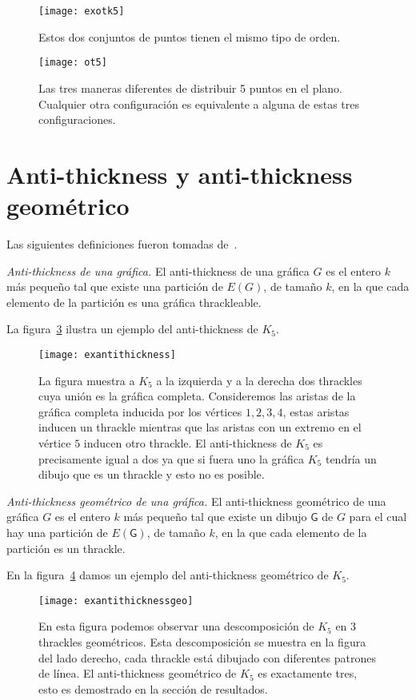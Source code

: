 \begin{figure}[htpb]
  \centering
  \texttt{[image: exotk5]}
  \caption{Estos dos conjuntos de puntos tienen el mismo tipo de orden.}
  \label{fig:exotk5}
\end{figure}
\begin{figure}[htpb]
  \centering
  \texttt{[image: ot5]}
  \caption{Las tres maneras diferentes de distribuir 5 puntos en el plano. Cualquier
  otra configuración es equivalente a alguna de estas tres configuraciones.}
  \label{fig:ot5}
\end{figure}

\section{Anti-thickness y anti-thickness geométrico}
Las siguientes definiciones fueron tomadas de~\cite{Dujmovic2017}.
\begin{definition}{\emph{Anti-thickness de una gráfica.}}
  El anti-thickness de una gráfica $G$ es el entero $k$ más pequeño tal que existe una
  partición de $E(G)$, de tamaño $k$, en la que cada elemento de la partición
  es una gráfica thrackleable.
\end{definition}
La figura~\ref{fig:exantithickness} ilustra un ejemplo del anti-thickness de $K_5$.
\begin{figure}[htpb]
  \centering
  \texttt{[image: exantithickness]}
  \caption{La figura muestra a $K_5$ a la izquierda y a la derecha dos thrackles
  cuya unión es la gráfica completa. Consideremos las aristas de la gráfica completa inducida por los vértices $1,2,3,4$,
  estas aristas inducen un thrackle mientras que las aristas con un extremo en el vértice $5$ inducen otro thrackle.
  El anti-thickness de $K_5$ es precisamente igual a dos ya que si fuera uno la gráfica $K_5$ tendría un dibujo
  que es un thrackle y esto no es posible.}
  \label{fig:exantithickness}
\end{figure}
\begin{definition}{\emph{Anti-thickness geométrico de una gráfica.}}
El anti-thickness geométrico de una gráfica $G$ es el entero $k$ más pequeño tal que
existe un dibujo $\mathsf{G}$ de $G$ para el cual hay una partición de $E(\mathsf{G})$,
de tamaño $k$, en la que cada elemento de la partición es un thrackle.
\end{definition}
En la figura~\ref{fig:exantithicknessgeo} damos un ejemplo del anti-thickness geométrico de $K_5$.
\begin{figure}[htpb]
  \centering
  \texttt{[image: exantithicknessgeo]}
  \caption{En esta figura podemos observar una descomposición de $K_5$ en 3 thrackles
  geométricos. Esta descomposición se muestra en la figura del lado derecho, cada
  thrackle está dibujado con diferentes patrones de línea. El anti-thickness geométrico
  de $K_5$ es exactamente tres, esto es demostrado en la sección de resultados.}
  \label{fig:exantithicknessgeo}
\end{figure}
